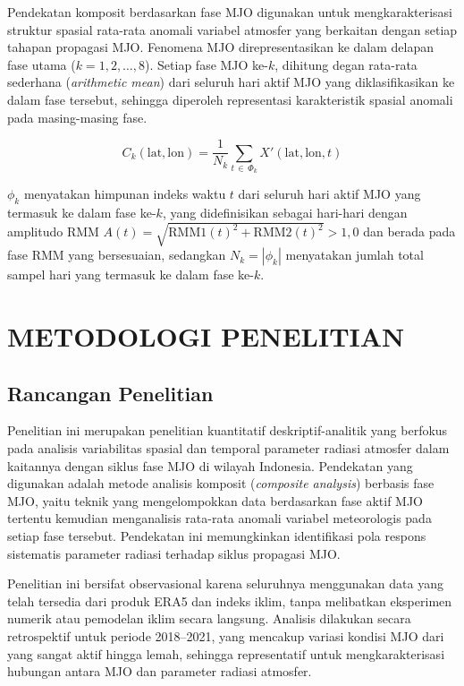 \documentclass[12pt,a4paper]{report}
\begin{document}
Pendekatan komposit berdasarkan fase MJO digunakan untuk
mengkarakterisasi struktur spasial rata-rata anomali variabel atmosfer
yang berkaitan dengan setiap tahapan propagasi 
MJO. Fenomena MJO direpresentasikan ke dalam delapan fase utama
($k = 1, 2, \ldots, 8$). Setiap fase MJO ke-$k$, dihitung degan rata-rata sederhana (\textit{arithmetic mean})
dari seluruh hari aktif MJO yang diklasifikasikan ke dalam fase tersebut,
sehingga diperoleh representasi karakteristik spasial anomali pada masing-masing fase.
 
\begin{equation}
  C_k(\mathrm{lat}, \mathrm{lon}) =
  \frac{1}{N_k}
  \sum_{t \,\in\, \Phi_k} X'(\mathrm{lat}, \mathrm{lon}, t)
  \label{eq:composite}
\end{equation}


$\phi_k$ menyatakan himpunan indeks waktu $t$ dari seluruh hari aktif MJO yang termasuk ke dalam fase ke-$k$, yang didefinisikan sebagai hari-hari dengan amplitudo RMM $A(t)=\sqrt{\mathrm{RMM1}(t)^2+\mathrm{RMM2}(t)^2}>1{,}0$ dan berada pada fase RMM yang bersesuaian, sedangkan $N_k=|\phi_k|$ menyatakan jumlah total sampel hari yang termasuk ke dalam fase ke-$k$.




\chapter{METODOLOGI PENELITIAN}

\section{Rancangan Penelitian}

 Penelitian ini merupakan penelitian kuantitatif deskriptif-analitik yang
berfokus pada analisis variabilitas spasial dan temporal parameter radiasi
atmosfer dalam kaitannya dengan siklus fase MJO di wilayah Indonesia. Pendekatan yang digunakan adalah metode analisis
komposit (\textit{composite analysis}) berbasis fase MJO, yaitu teknik yang
mengelompokkan data berdasarkan fase aktif MJO tertentu kemudian menganalisis
rata-rata anomali variabel meteorologis pada setiap fase tersebut. Pendekatan
ini memungkinkan identifikasi pola respons sistematis parameter radiasi terhadap
siklus propagasi MJO.

Penelitian ini bersifat observasional karena seluruhnya menggunakan data yang
telah tersedia dari produk ERA5 dan indeks iklim, tanpa melibatkan
eksperimen numerik atau pemodelan iklim secara langsung. Analisis dilakukan
secara retrospektif untuk periode 2018--2021, yang mencakup variasi kondisi MJO
dari yang sangat aktif hingga lemah, sehingga representatif untuk
mengkarakterisasi hubungan antara MJO dan parameter radiasi atmosfer.
\end{document}
